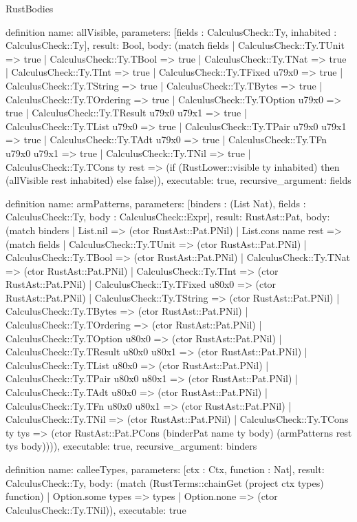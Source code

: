 \begin{lexlean}{RustBodies}
\begin{semanticmodule}
definition{
  name: allVisible,
  parameters: [fields : CalculusCheck::Ty, inhabited : CalculusCheck::Ty],
  result: Bool,
  body: (match fields
    | CalculusCheck::Ty.TUnit => true
    | CalculusCheck::Ty.TBool => true
    | CalculusCheck::Ty.TNat => true
    | CalculusCheck::Ty.TInt => true
    | CalculusCheck::Ty.TFixed u79x0 => true
    | CalculusCheck::Ty.TString => true
    | CalculusCheck::Ty.TBytes => true
    | CalculusCheck::Ty.TOrdering => true
    | CalculusCheck::Ty.TOption u79x0 => true
    | CalculusCheck::Ty.TResult u79x0 u79x1 => true
    | CalculusCheck::Ty.TList u79x0 => true
    | CalculusCheck::Ty.TPair u79x0 u79x1 => true
    | CalculusCheck::Ty.TAdt u79x0 => true
    | CalculusCheck::Ty.TFn u79x0 u79x1 => true
    | CalculusCheck::Ty.TNil => true
    | CalculusCheck::Ty.TCons ty rest => (if (RustLower::visible ty inhabited) then (allVisible rest inhabited) else false)),
  executable: true,
  recursive_argument: fields
}

definition{
  name: armPatterns,
  parameters: [binders : (List Nat), fields : CalculusCheck::Ty, body : CalculusCheck::Expr],
  result: RustAst::Pat,
  body: (match binders
    | List.nil => (ctor RustAst::Pat.PNil)
    | List.cons name rest => (match fields
      | CalculusCheck::Ty.TUnit => (ctor RustAst::Pat.PNil)
      | CalculusCheck::Ty.TBool => (ctor RustAst::Pat.PNil)
      | CalculusCheck::Ty.TNat => (ctor RustAst::Pat.PNil)
      | CalculusCheck::Ty.TInt => (ctor RustAst::Pat.PNil)
      | CalculusCheck::Ty.TFixed u80x0 => (ctor RustAst::Pat.PNil)
      | CalculusCheck::Ty.TString => (ctor RustAst::Pat.PNil)
      | CalculusCheck::Ty.TBytes => (ctor RustAst::Pat.PNil)
      | CalculusCheck::Ty.TOrdering => (ctor RustAst::Pat.PNil)
      | CalculusCheck::Ty.TOption u80x0 => (ctor RustAst::Pat.PNil)
      | CalculusCheck::Ty.TResult u80x0 u80x1 => (ctor RustAst::Pat.PNil)
      | CalculusCheck::Ty.TList u80x0 => (ctor RustAst::Pat.PNil)
      | CalculusCheck::Ty.TPair u80x0 u80x1 => (ctor RustAst::Pat.PNil)
      | CalculusCheck::Ty.TAdt u80x0 => (ctor RustAst::Pat.PNil)
      | CalculusCheck::Ty.TFn u80x0 u80x1 => (ctor RustAst::Pat.PNil)
      | CalculusCheck::Ty.TNil => (ctor RustAst::Pat.PNil)
      | CalculusCheck::Ty.TCons ty tys => (ctor RustAst::Pat.PCons (binderPat name ty body) (armPatterns rest tys body)))),
  executable: true,
  recursive_argument: binders
}

definition{
  name: calleeTypes,
  parameters: [ctx : Ctx, function : Nat],
  result: CalculusCheck::Ty,
  body: (match (RustTerms::chainGet (project ctx types) function)
    | Option.some types => types
    | Option.none => (ctor CalculusCheck::Ty.TNil)),
  executable: true
}


\end{semanticmodule}
\end{lexlean}
